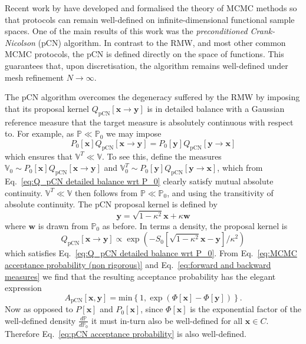 Recent work by \citep{beskosMCMCMETHODSDIFFUSION2008, cotterMCMCMethodsFunctions2013, hairerAnalysisSPDEsArising2005, hairerAnalysisSPDEsArising2007} have developed and formalised the theory of MCMC methods so that protocols can remain well-defined on infinite-dimensional functional sample spaces. One of the main results of this work was the \textit{preconditioned Crank-Nicolson} (pCN) algorithm. In contrast to the RMW, and most other common MCMC protocols, the pCN is defined directly on the space of functions. This guarantees that, upon discretisation, the algorithm remains well-defined under mesh refinement $N \to \infty$.

The pCN algorithm overcomes the degeneracy suffered by the RMW by imposing that its proposal kernel $Q_\text{pCN}[\mathbf{x} \to \mathbf{y}]$ is in detailed balance with a Gaussian reference measure that the target measure is absolutely continuous with respect to. For example, as $\mathbb{P} \ll \mathbb{P}_0$ we may impose
\begin{equation} \label{eq:Q_pCN detailed balance wrt P_0}
	P_0[\mathbf{x}] Q_\text{pCN}[\mathbf{x} \to \mathbf{y}] = P_0[\mathbf{y}] Q_\text{pCN}[\mathbf{y} \to \mathbf{x}]
\end{equation}
which ensures that $\mathbb{V}^T \ll \mathbb{V}$. To see this, define the measures $\mathbb{V}_0 \sim P_0[\mathbf{x}] Q_\text{pCN}[\mathbf{x} \to \mathbf{y}]$ and $\mathbb{V}_0^T \sim P_0[\mathbf{y}] Q_\text{pCN}[\mathbf{y} \to \mathbf{x}]$, which from Eq.~\ref{eq:Q_pCN detailed balance wrt P_0} clearly satisfy mutual absolute continuity. $\mathbb{V}^T \ll \mathbb{V}$ then follows from $\mathbb{P} \ll \mathbb{P}_0$, and using the transitivity of absolute continuity. The pCN proposal kernel is defined by
\begin{equation}
	\mathbf{y} = \sqrt{1 - \kappa^2} \mathbf{x} + \kappa \mathbf{w}
\end{equation}
where $\mathbf{w}$ is drawn from $\mathbb{P}_0$ as before. In terms a density, the proposal kernel is
\begin{equation}  \label{eq:pCN transition kernel}
	Q_\text{pCN}[\mathbf{x} \to \mathbf{y}] \propto \exp ( - S_0[ \sqrt{1 - \kappa^2} \mathbf{x} - \mathbf{y}] / \kappa^2 ) 
\end{equation}
which satisfies Eq.~\ref{eq:Q_pCN detailed balance wrt P_0}. From Eq.~\ref{eq:MCMC acceptance probability (non rigorous)} and Eq.~\ref{eq:forward and backward measures} we find that the resulting acceptance probability has the elegant expression
\begin{equation} \label{eq:pCN acceptance probability}
A_\text{pCN}[\mathbf{x}, \mathbf{y}] = \text{min} \left\{ 1, 
\exp \left( \Phi[\mathbf{x}] - \Phi[\mathbf{y}] \right)
\right\}.
\end{equation}
Now as opposed to $P[\mathbf{x}]$ and $P_0[\mathbf{x}]$, since $\Phi[\mathbf{x}]$ is the exponential factor of the well-defined density $\frac{d \mathbb{P}}{d \mathbb{P}_0}$ it must in-turn also be well-defined for all $\mathbf{x} \in C$. Therefore Eq.~\ref{eq:pCN acceptance probability} is also well-defined.

